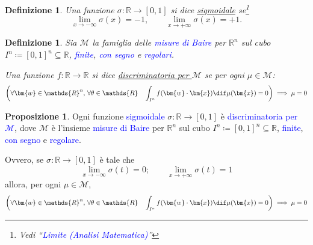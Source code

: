 \documentclass[10pt]{book}
\newcommand{\1}{\mathds{1}}
\newcommand{\R}{\mathds{R}}
\theoremstyle{definition}%
\newtheorem{prop}[thm]{Proposizione}
\theoremstyle{plain}
\newtheorem{definizione}[thm]{Definizione}
\theoremstyle{remark}
\renewcommand{\href}[2]{\textcolor{blue}{#2}}
\begin{document}
\begin{definizione}
Una funzione \(\sigma:\R\to [0,1]\) si dice \uline{sigmoidale} se\footnote{Vedi ``\href{../../../../../org/roam/20250625110412-limite_analisi_matematica.org}{Limite (Analisi Matematica)}''}
\begin{equation*}
\lim_{x\to-\infty} \sigma(x) = -1,\qquad \lim_{x\to +\infty} \sigma(x)= +1.
\end{equation*}
\end{definizione}
\begin{definizione}
Sia \(\mathcal{M}\) la famiglia delle \href{../../../../../org/roam/20250625104200-misura_di_baire.org}{misure di Baire} per \(\R^{n}\) sul cubo \(I^{n} \coloneqq [0,1]^{n} \subseteq \R\), \href{../../../../../org/roam/20250625110016-misura_finita.org}{finite}, \href{../../../../../org/roam/20250625110024-misura_con_segno.org}{con segno} e \href{../../../../../org/roam/20250625110032-misura_regolare.org}{regolari}.

Una funzione \(f: \R\to \R\) si dice \uline{discriminatoria per \(\mathcal{M}\)} se per ogni \(\mu \in \mathcal{M}\):
\begin{equation*}
\left(\forall \bm{w} \in \R^{n},\, \forall \theta \in \R\quad \int_{I^{n}} f(\bm{w}\cdot\bm{x}) \dif \mu(\bm{x}) = 0\right)\implies \mu=0
\end{equation*}
\end{definizione}
\begin{prop}
Ogni funzione \href{../../../../../org/roam/20250625110110-funzione_sigmoidale.org}{sigmoidale} \(\sigma:\R\to [0,1]\) è \href{../../../../../org/roam/20250625105528-funzione_discriminatoria_per_una_misura_di_baire_sul_cubo_unitario.org}{discriminatoria per \(\mathcal{M}\)}, dove \(\mathcal{M}\) è l'insieme \href{../../../../../org/roam/20250625104200-misura_di_baire.org}{misure di Baire} per \(\R^{n}\) sul cubo \(I^{n} \coloneqq [0,1]^{n} \subseteq \R\), \href{../../../../../org/roam/20250625110016-misura_finita.org}{finite}, \href{../../../../../org/roam/20250625110024-misura_con_segno.org}{con segno} e \href{../../../../../org/roam/20250625110032-misura_regolare.org}{regolare}.

Ovvero, se \(\sigma:\R\to [0,1]\) è tale che
\begin{equation*}
\lim_{x\to-\infty}\sigma(t) =0;\qquad \lim_{x\to+\infty}\sigma(t)=1
\end{equation*}
allora, per ogni \(\mu \in \mathcal{M}\),
\begin{equation*}
\left(\forall \bm{w} \in \R^{n},\, \forall \theta \in \R\quad \int_{I^{n}} f(\bm{w}\cdot\bm{x}) \dif \mu(\bm{x}) = 0\right)\implies \mu=0
\end{equation*}
\end{prop}
\end{document}

